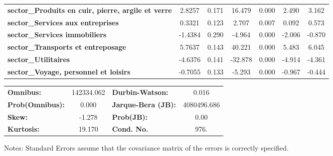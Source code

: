 \begin{center}
\begin{tabular}{lcccccc}
\textbf{sector\_Produits en cuir, pierre, argile et verre}            &       2.8257  &        0.171     &    16.479  &         0.000        &        2.490    &        3.162     \\
\textbf{sector\_Services aux entreprises}                             &       0.3321  &        0.123     &     2.707  &         0.007        &        0.092    &        0.573     \\
\textbf{sector\_Services immobiliers}                                 &      -1.4384  &        0.290     &    -4.964  &         0.000        &       -2.006    &       -0.870     \\
\textbf{sector\_Transports et entreposage}                            &       5.7637  &        0.143     &    40.221  &         0.000        &        5.483    &        6.045     \\
\textbf{sector\_Utilitaires}                                          &      -4.6376  &        0.141     &   -32.878  &         0.000        &       -4.914    &       -4.361     \\
\textbf{sector\_Voyage, personnel et loisirs}                         &      -0.7055  &        0.133     &    -5.293  &         0.000        &       -0.967    &       -0.444     \\
\bottomrule
\end{tabular}
\begin{tabular}{lclc}
\textbf{Omnibus:}       & 142334.062 & \textbf{  Durbin-Watson:     } &      0.016   \\
\textbf{Prob(Omnibus):} &    0.000   & \textbf{  Jarque-Bera (JB):  } & 4080496.686  \\
\textbf{Skew:}          &   -1.278   & \textbf{  Prob(JB):          } &       0.00   \\
\textbf{Kurtosis:}      &   19.170   & \textbf{  Cond. No.          } &       976.   \\
\bottomrule
\end{tabular}
\end{center}

Notes: \newline
 [1] Standard Errors assume that the covariance matrix of the errors is correctly specified.